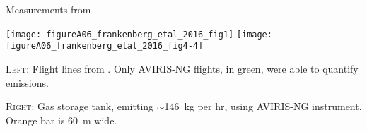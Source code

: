 \caption{Measurements from \textcite{Frankenberg/etal:2016}}
\label{fig:frankenberg-measurement-figs}

\texttt{[image: figureA06\_frankenberg\_etal\_2016\_fig1]}
\texttt{[image: figureA06\_frankenberg\_etal\_2016\_fig4-4]}

\textsc{Left:}
Flight lines from \textcite{Frankenberg/etal:2016}.
Only \gls{AVIRIS-NG} flights, in green, were able to quantify emissions.

\textsc{Right:}
Gas storage tank, emitting \(\sim\)146~kg  per hr, using \gls{AVIRIS-NG} instrument.
Orange bar is 60~m wide.
